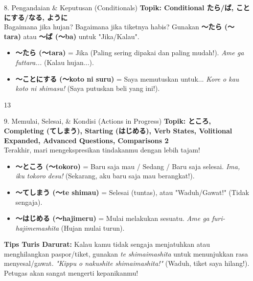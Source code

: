 \begin{lessonbox}{8. Pengandaian \& Keputusan (Conditionals)}
    \textbf{Topik: Conditional たら/ば, ことにする/なる, ように} \\
    Bagaimana jika hujan? Bagaimana jika tiketnya habis? Gunakan \textbf{〜たら (〜tara)} atau \textbf{〜ば (〜ba)} untuk "Jika/Kalau".
    \begin{itemize}
        \item \textbf{〜たら (〜tara)} = Jika (Paling sering dipakai dan paling mudah!). \textit{Ame ga futtara...} (Kalau hujan...).
        \item \textbf{〜ことにする (〜koto ni suru)} = Saya memutuskan untuk... \textit{Kore o kau koto ni shimasu!} (Saya putuskan beli yang ini!).
    \end{itemize}
\end{lessonbox}

\begin{convobox}{13}
    \noindent
      
      

    \vspace{1.5em}
\end{convobox}

\begin{lessonbox}{9. Memulai, Selesai, \& Kondisi (Actions in Progress)}
    \textbf{Topik: ところ, Completing (てしまう), Starting (はじめる), Verb States, Volitional Expanded, Advanced Questions, Comparisons 2} \\
    Terakhir, mari mengekspresikan tindakanmu dengan lebih tajam!
    \begin{itemize}
        \item \textbf{〜ところ (〜tokoro)} = Baru saja mau / Sedang / Baru saja selesai. \textit{Ima, iku tokoro desu!} (Sekarang, aku baru saja mau berangkat!).
        \item \textbf{〜てしまう (〜te shimau)} = Selesai (tuntas), atau "Waduh/Gawat!" (Tidak sengaja).
        \item \textbf{〜はじめる (〜hajimeru)} = Mulai melakukan sesuatu. \textit{Ame ga furi-hajimemashita} (Hujan mulai turun).
    \end{itemize}
    \textbf{Tips Turis Darurat:} Kalau kamu tidak sengaja menjatuhkan atau menghilangkan paspor/tiket, gunakan \textit{te shimaimashita} untuk menunjukkan rasa menyesal/gawat. \textit{"Kippu o nakushite shimaimashita!"} (Waduh, tiket saya hilang!). Petugas akan sangat mengerti kepanikanmu!
\end{lessonbox}

